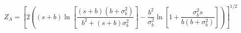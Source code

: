 \begin{equation}
  Z_A = \left[ 2 \left( (s+b) \ln \left[
      \frac{(s+b)(b+\sigma_b^2)}{b^2+(s+b)\sigma_b^2} \right] -
    \frac{b^2}{\sigma_b^2} \ln \left[ 1 + \frac{\sigma_b^2 s}{b(b+\sigma_b^2)}
      \right] \right) \right]^{1/2}
  \label{eq:Za}
\end{equation}









